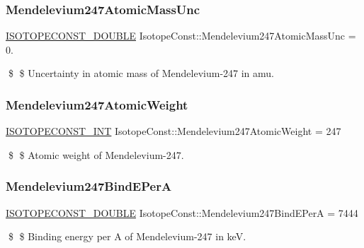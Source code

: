 \subsubsection{\texorpdfstring{Mendelevium247\+Atomic\+Mass\+Unc}{Mendelevium247AtomicMassUnc}}
{\footnotesize\ttfamily \mbox{\hyperlink{group___isotope_const-_macros_ga8f45a7272ce02c0b4c65c44636ed719a}{I\+S\+O\+T\+O\+P\+E\+C\+O\+N\+S\+T\+\_\+\+D\+O\+U\+B\+LE}} Isotope\+Const\+::\+Mendelevium247\+Atomic\+Mass\+Unc = 0.}

\$ \$ Uncertainty in atomic mass of Mendelevium-\/247 in amu. \mbox{\label{group___isotope_const-_mendelevium-_md247_ga467412412fb55f626763d7ab0ca869ed}} 
\subsubsection{\texorpdfstring{Mendelevium247\+Atomic\+Weight}{Mendelevium247AtomicWeight}}
{\footnotesize\ttfamily \mbox{\hyperlink{group___isotope_const-_macros_ga5f18360b3e99483a35c32d789e62621c}{I\+S\+O\+T\+O\+P\+E\+C\+O\+N\+S\+T\+\_\+\+I\+NT}} Isotope\+Const\+::\+Mendelevium247\+Atomic\+Weight = 247}

\$ \$ Atomic weight of Mendelevium-\/247. \mbox{\label{group___isotope_const-_mendelevium-_md247_ga7045ba128e5c642512cdd4421af21f62}} 
\subsubsection{\texorpdfstring{Mendelevium247\+Bind\+E\+PerA}{Mendelevium247BindEPerA}}
{\footnotesize\ttfamily \mbox{\hyperlink{group___isotope_const-_macros_ga8f45a7272ce02c0b4c65c44636ed719a}{I\+S\+O\+T\+O\+P\+E\+C\+O\+N\+S\+T\+\_\+\+D\+O\+U\+B\+LE}} Isotope\+Const\+::\+Mendelevium247\+Bind\+E\+PerA = 7444}

\$ \$ Binding energy per A of Mendelevium-\/247 in keV. \mbox{\label{group___isotope_const-_mendelevium-_md247_ga63266d8a7755da85339aaa78492bfd32}} 
